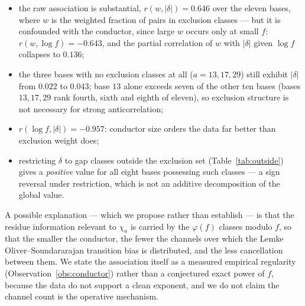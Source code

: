 \documentclass[11pt,reqno]{amsart}
\theoremstyle{plain}
\theoremstyle{definition}
\begin{document}
\begin{itemize}
\item the raw association is substantial, $r(w, |\delta|) = 0.646$ over the
      eleven bases, where $w$ is the weighted fraction of pairs in exclusion
      classes --- but it is confounded with the conductor, since large $w$
      occurs only at small $f$: $r(w, \log f) = -0.643$, and the partial
      correlation of $w$ with $|\delta|$ given $\log f$ collapses to $0.136$;
\item the three bases with no exclusion classes at all ($a = 13, 17, 29$)
      still exhibit $|\delta|$ from $0.022$ to $0.043$; base $13$ alone exceeds
      seven of the other ten bases (bases $13, 17, 29$ rank fourth, sixth and
      eighth of eleven), so exclusion structure is not necessary for strong
      anticorrelation;
\item $r(\log f, |\delta|) = -0.957$: conductor size orders the data far
      better than exclusion weight does;
\item restricting $\delta$ to gap classes outside the exclusion set
      (Table~\ref{tab:outside}) gives a \emph{positive} value for all eight
      bases possessing such classes --- a sign reversal under restriction,
      which is not an additive decomposition of the global value.
\end{itemize}

A possible explanation --- which we propose rather than establish --- is that
the residue information relevant to $\chi_a$ is carried by the $\varphi(f)$
classes modulo $f$, so that the smaller the conductor, the fewer the channels
over which the Lemke Oliver--Soundararajan transition bias is distributed, and
the less cancellation between them. We state the association itself as a
measured empirical regularity (Observation~\ref{obs:conductor}) rather than a
conjectured exact power of $f$, because the data do not support a clean
exponent, and we do not claim the channel count is the operative mechanism.
\end{document}
